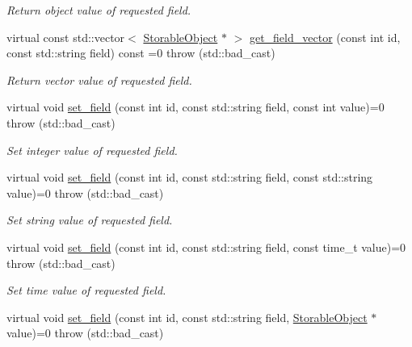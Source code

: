 \begin{DoxyCompactItemize}
\begin{DoxyCompactList}\small\item\em Return object value of requested field. \item\end{DoxyCompactList}\item 
virtual const std::vector$<$ \hyperlink{classStorage_1_1StorableObject}{StorableObject} $\ast$ $>$ \hyperlink{classStorage_1_1AbstractStorage_ae7c30697d68dc9d7de595388030d8e10}{get\_\-field\_\-vector} (const int id, const std::string field) const =0  throw (std::bad\_\-cast)
\begin{DoxyCompactList}\small\item\em Return vector value of requested field. \item\end{DoxyCompactList}\item 
virtual void \hyperlink{classStorage_1_1AbstractStorage_acdd090d0beb6a8241914e7d78a7f2c0c}{set\_\-field} (const int id, const std::string field, const int value)=0  throw (std::bad\_\-cast)
\begin{DoxyCompactList}\small\item\em Set integer value of requested field. \item\end{DoxyCompactList}\item 
virtual void \hyperlink{classStorage_1_1AbstractStorage_ae5ee00e647f121b68ebada0f094058bc}{set\_\-field} (const int id, const std::string field, const std::string value)=0  throw (std::bad\_\-cast)
\begin{DoxyCompactList}\small\item\em Set string value of requested field. \item\end{DoxyCompactList}\item 
virtual void \hyperlink{classStorage_1_1AbstractStorage_a50ee4a829bc067a9291a11aa99ec0f16}{set\_\-field} (const int id, const std::string field, const time\_\-t value)=0  throw (std::bad\_\-cast)
\begin{DoxyCompactList}\small\item\em Set time value of requested field. \item\end{DoxyCompactList}\item 
virtual void \hyperlink{classStorage_1_1AbstractStorage_a7ef9f70b3fcbaa2863de2be695dc77c1}{set\_\-field} (const int id, const std::string field, \hyperlink{classStorage_1_1StorableObject}{StorableObject} $\ast$value)=0  throw (std::bad\_\-cast)

\end{DoxyCompactItemize}
